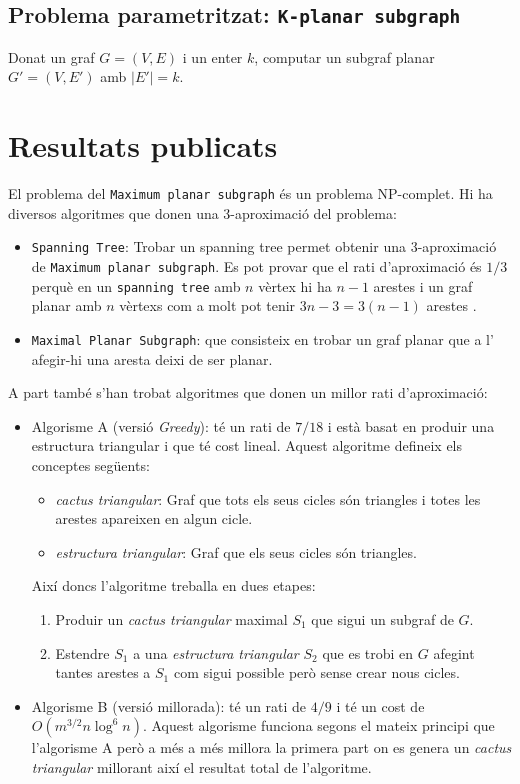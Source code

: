 \documentclass[a4paper]{article}
\begin{document}
\subsection{Problema parametritzat: \texttt{K-planar subgraph}}
Donat un graf $G=(V,E)$ i un enter $k$, computar un subgraf planar $G'=(V,E')$ amb $|E'|=k$.

\section{Resultats publicats}
El problema del \texttt{Maximum planar subgraph} és un problema NP-complet. Hi ha diversos algoritmes que donen una 3-aproximació del problema\cite{betterApproximation}:
\begin{itemize}
	\item \texttt{Spanning Tree}: Trobar un spanning tree permet obtenir una 3-aproximació de \texttt{Maximum planar subgraph}. Es pot provar que el rati d'aproximació és $1/3$ perquè en un \texttt{spanning tree} amb $n$ vèrtex hi ha $n - 1$ arestes i un graf planar amb $n$ vèrtexs com a molt pot tenir $3n - 3 = 3(n - 1)$ arestes \cite{planar}.
	\item \texttt{Maximal Planar Subgraph}: que consisteix en trobar un graf planar que a l' afegir-hi una aresta deixi de ser planar.	
\end{itemize}

A part també s'han trobat algoritmes que donen un millor rati d'aproximació:
\begin{itemize}
	\item Algorisme A (versió \emph{Greedy}): té un rati de $7/18$ i està basat en produir una estructura triangular i que té cost lineal. Aquest algoritme defineix els conceptes següents:
	\begin{itemize}
		\item \emph{cactus triangular}: Graf que tots els seus cicles són triangles i totes les arestes apareixen en algun cicle.
		\item \emph{estructura triangular}: Graf que els seus cicles són triangles.
	\end{itemize}
	Així doncs l'algoritme treballa en dues etapes:
	\begin{enumerate}
		\item Produir un \emph{cactus triangular} maximal $S_1$ que sigui un subgraf de $G$.
		\item Estendre $S_1$ a una \emph{estructura triangular} $S_2$ que es trobi en $G$ afegint tantes arestes a $S_1$ com sigui possible però sense crear nous cicles.
	\end{enumerate}
	\item Algorisme B (versió millorada): té un rati de $4/9$ i té un cost de $O(m^{3/2}n\log^6 n)$. Aquest algorisme funciona segons el mateix principi que l'algorisme A però a més a més millora la primera part on es genera un \emph{cactus triangular} millorant així el resultat total de l'algoritme. 
\end{itemize}
\end{document}
